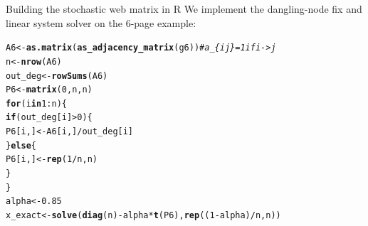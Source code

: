 \documentclass[aspectratio=169]{beamer}\usepackage[]{graphicx}\usepackage[]{xcolor}
\makeatletter
\newcommand{\hlnum}[1]{\textcolor[rgb]{0.686,0.059,0.569}{#1}}%
\newcommand{\hlcom}[1]{\textcolor[rgb]{0.678,0.584,0.686}{\textit{#1}}}%
\newcommand{\hlopt}[1]{\textcolor[rgb]{0,0,0}{#1}}%
\newcommand{\hldef}[1]{\textcolor[rgb]{0.345,0.345,0.345}{#1}}%
\newcommand{\hlkwa}[1]{\textcolor[rgb]{0.161,0.373,0.58}{\textbf{#1}}}%
\newcommand{\hlkwb}[1]{\textcolor[rgb]{0.69,0.353,0.396}{#1}}%
\newcommand{\hlkwd}[1]{\textcolor[rgb]{0.737,0.353,0.396}{\textbf{#1}}}%
\newenvironment{kframe}{%
 \def\at@end@of@kframe{}%
 \ifinner\ifhmode%
  \def\at@end@of@kframe{\end{minipage}}%
  \begin{minipage}{\columnwidth}%
 \fi\fi%
 \def\FrameCommand##1{\hskip\@totalleftmargin \hskip-\fboxsep
 \colorbox{shadecolor}{##1}\hskip-\fboxsep
     \hskip-\linewidth \hskip-\@totalleftmargin \hskip\columnwidth}%
 \MakeFramed {\advance\hsize-\width
   \@totalleftmargin\z@ \linewidth\hsize
   \@setminipage}}%
 {\par\unskip\endMakeFramed%
 \at@end@of@kframe}
\newenvironment{knitrout}{}{} %
\makeatother
\begin{document}
\begin{frame}[fragile]{Building the stochastic web matrix in R}
We implement the dangling-node fix and linear system solver on the 6-page example:
\begin{knitrout}
\color{fgcolor}\begin{kframe}
\begin{alltt}
\hldef{A6} \hlkwb{<-} \hlkwd{as.matrix}\hldef{(}\hlkwd{as_adjacency_matrix}\hldef{(g6))} \hlcom{# a_\{ij\} = 1 if i -> j}
\hldef{n} \hlkwb{<-} \hlkwd{nrow}\hldef{(A6)}
\hldef{out_deg} \hlkwb{<-} \hlkwd{rowSums}\hldef{(A6)}
\hldef{P6} \hlkwb{<-} \hlkwd{matrix}\hldef{(}\hlnum{0}\hldef{, n, n)}
\hlkwa{for} \hldef{(i} \hlkwa{in} \hlnum{1}\hlopt{:}\hldef{n) \{}
  \hlkwa{if} \hldef{(out_deg[i]} \hlopt{>} \hlnum{0}\hldef{) \{}
    \hldef{P6[i, ]} \hlkwb{<-} \hldef{A6[i, ]} \hlopt{/} \hldef{out_deg[i]}
  \hldef{\}} \hlkwa{else} \hldef{\{}
    \hldef{P6[i, ]} \hlkwb{<-} \hlkwd{rep}\hldef{(}\hlnum{1} \hlopt{/} \hldef{n, n)}
  \hldef{\}}
\hldef{\}}
\hldef{alpha} \hlkwb{<-} \hlnum{0.85}
\hldef{x_exact} \hlkwb{<-} \hlkwd{solve}\hldef{(}\hlkwd{diag}\hldef{(n)} \hlopt{-} \hldef{alpha} \hlopt{*} \hlkwd{t}\hldef{(P6),} \hlkwd{rep}\hldef{((}\hlnum{1} \hlopt{-} \hldef{alpha)} \hlopt{/} \hldef{n, n))}
\end{alltt}
\end{kframe}
\end{knitrout}
\end{frame}
\end{document}
